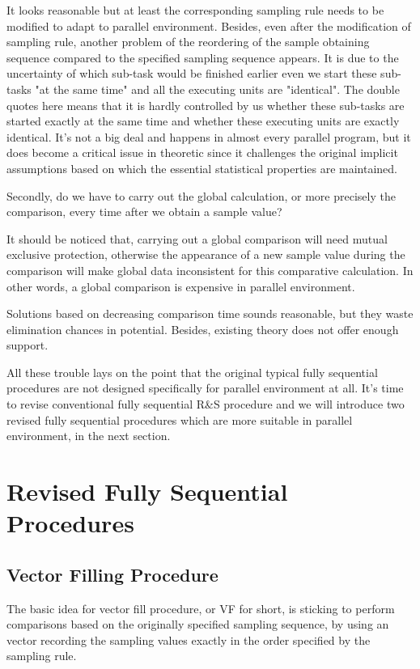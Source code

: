 \documentclass[12pt,a4]{report}
\begin{document}
It looks reasonable but at least the corresponding sampling rule needs to be modified to adapt to parallel environment. Besides, even after the modification of sampling rule, another problem of the reordering of the sample obtaining sequence compared to the specified sampling sequence appears. It is due to the uncertainty of which sub-task would be finished earlier even we start these sub-tasks "at the same time" and all the executing units are "identical". The double quotes here means that it is hardly controlled by us whether these sub-tasks are started exactly at the same time and whether these executing units are exactly identical. It's not a big deal and happens in almost every parallel program, but it does become a critical issue in theoretic since it challenges the original implicit assumptions based on which the essential statistical properties are maintained.

Secondly, do we have to carry out the global calculation, or more precisely the comparison, every time after we obtain a sample value?

It should be noticed that, carrying out a global comparison will need mutual exclusive protection, otherwise the appearance of a new sample value during the comparison will make global data inconsistent for this comparative calculation. In other words, a global comparison is expensive in parallel environment.

Solutions based on decreasing comparison time sounds reasonable, but they waste elimination chances in potential. Besides, existing theory does not offer enough support.

All these trouble lays on the point that the original typical fully sequential procedures are not designed specifically for parallel environment at all. It's time to revise conventional fully sequential R\&S procedure and we will introduce two revised fully sequential procedures which are more suitable in parallel environment, in the next section.

\section{Revised Fully Sequential Procedures}

\subsection{Vector Filling Procedure}

The basic idea for vector fill procedure, or VF for short, is sticking to perform comparisons based on the originally specified sampling sequence, by using an vector recording the sampling values exactly in the order specified by the sampling rule.
\end{document}
